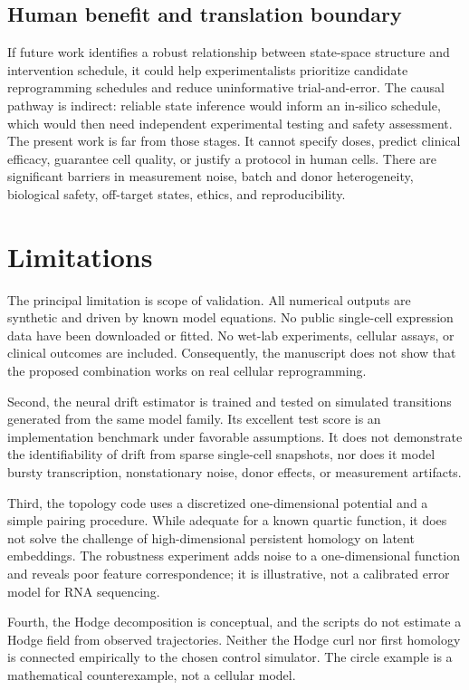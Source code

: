 \documentclass[11pt]{article}
\newcommand{\1}{\mathbf{1}}
\begin{document}
\subsection{Human benefit and translation boundary}
If future work identifies a robust relationship between state-space structure and intervention schedule, it could help experimentalists prioritize candidate reprogramming schedules and reduce uninformative trial-and-error. The causal pathway is indirect: reliable state inference would inform an in-silico schedule, which would then need independent experimental testing and safety assessment. The present work is far from those stages. It cannot specify doses, predict clinical efficacy, guarantee cell quality, or justify a protocol in human cells. There are significant barriers in measurement noise, batch and donor heterogeneity, biological safety, off-target states, ethics, and reproducibility.

\section{Limitations}
The principal limitation is scope of validation. All numerical outputs are synthetic and driven by known model equations. No public single-cell expression data have been downloaded or fitted. No wet-lab experiments, cellular assays, or clinical outcomes are included. Consequently, the manuscript does not show that the proposed combination works on real cellular reprogramming.

Second, the neural drift estimator is trained and tested on simulated transitions generated from the same model family. Its excellent test score is an implementation benchmark under favorable assumptions. It does not demonstrate the identifiability of drift from sparse single-cell snapshots, nor does it model bursty transcription, nonstationary noise, donor effects, or measurement artifacts.

Third, the topology code uses a discretized one-dimensional potential and a simple pairing procedure. While adequate for a known quartic function, it does not solve the challenge of high-dimensional persistent homology on latent embeddings. The robustness experiment adds noise to a one-dimensional function and reveals poor feature correspondence; it is illustrative, not a calibrated error model for RNA sequencing.

Fourth, the Hodge decomposition is conceptual, and the scripts do not estimate a Hodge field from observed trajectories. Neither the Hodge curl nor first homology is connected empirically to the chosen control simulator. The circle example is a mathematical counterexample, not a cellular model.
\end{document}
